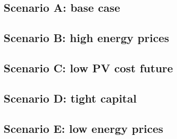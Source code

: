 \documentclass[11pt,a4paper]{report}
\begin{document}
\subsection{Scenario A: base case}
\label{sub:scenario_base}


\subsection{Scenario B: high energy prices}
\label{sub:scenario_highprice}


\subsection{Scenario C: low PV cost future}
\label{sub:scenario_lowpv}


\subsection{Scenario D: tight capital}
\label{sub:scenario_capital}


\subsection{Scenario E: low energy prices}
\label{sub:scenario_lowprice}
\end{document}
